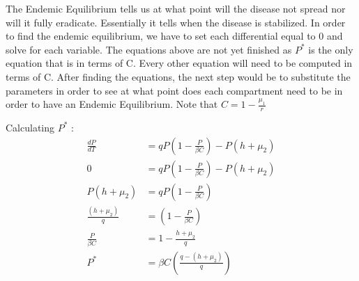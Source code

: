 \documentclass[12pt]{article}
\begin{document}
The Endemic Equilibrium tells us at what point will the disease not spread nor will it fully eradicate. Essentially it tells when the disease is stabilized. In order to find the endemic equilibrium, we have to set each differential equal to 0 and solve for each variable. The equations above are not yet finished as $P^{*}$ is the only equation that is in terms of C. Every other equation will need to be computed in terms of C. After finding the equations, the next step would be to substitute the parameters in order to see at what point does each compartment need to be in order to have an Endemic Equilibrium. Note that $C=1-\frac{\mu_{1}}{r}$ 

Calculating $P^{*}$ :
\begin{align*}
        \frac{dP}{dT} &= qP\left(1-\frac{P}{\beta C}\right) - P(h + \mu_{2})\\
        0 &= qP\left(1-\frac{P}{\beta C}\right) - P(h + \mu_{2})\\
        P(h+ \mu_{2}) &= qP\left(1-\frac{P}{\beta C}\right)\\
        \frac{(h+ \mu_{2})}{q} &= \left(1-\frac{P}{\beta C}\right)\\
        \frac{P}{\beta C} &= 1 - \frac{h+\mu_{2}}{q}\\
        P^{*} &= \beta C \left(\frac{q-(h+\mu_{2})}{q}\right)
    \end{align*}
\end{document}
